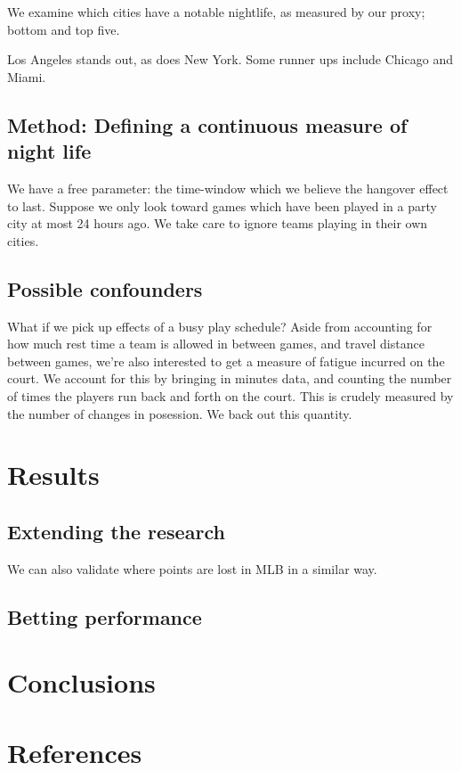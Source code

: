 \documentclass[letterpaper,12pt]{article}
\begin{document}
We examine which cities have a notable nightlife, as measured by our proxy;
bottom and top five.

Los Angeles stands out, as does New York. Some runner ups include Chicago and Miami. 

\subsection{Method: Defining a continuous measure of night life}

We have a free parameter: the time-window which we believe the hangover effect
to last. Suppose we only look toward games which have been played in a party
city at most 24 hours ago. We take care to ignore
teams playing in their own cities.

\subsection{Possible confounders}
What if we pick up effects of a busy play schedule?
Aside from accounting for how much rest time a team is allowed in between games,
and travel distance between games, we're also interested to get a measure of
fatigue incurred on the court.
We account for this by bringing in minutes data, and counting the number of 
times the players run back and forth on the court. This is crudely measured
by the number of changes in posession. We back out this quantity.

\section{Results}

\subsection{Extending the research}
We can also validate where points are lost in MLB in a similar way.

\subsection{Betting performance}


\section{Conclusions}

\section{References}
\end{document}
